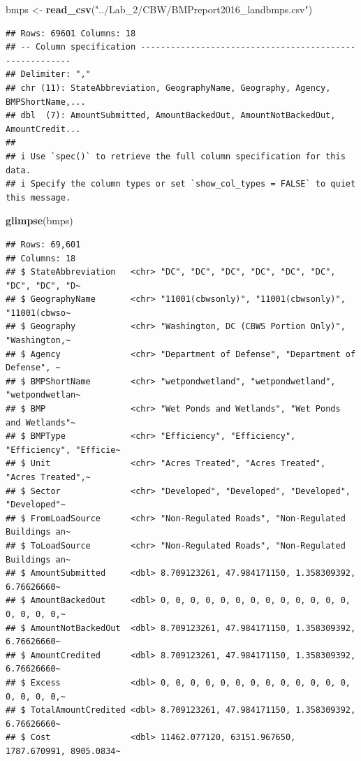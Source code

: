 \documentclass[
]{article}
\newenvironment{Shaded}{\begin{snugshade}}{\end{snugshade}}
\newcommand{\FunctionTok}[1]{\textcolor[rgb]{0.13,0.29,0.53}{\textbf{#1}}}
\newcommand{\NormalTok}[1]{#1}
\newcommand{\OtherTok}[1]{\textcolor[rgb]{0.56,0.35,0.01}{#1}}
\newcommand{\StringTok}[1]{\textcolor[rgb]{0.31,0.60,0.02}{#1}}
\begin{document}
\begin{Shaded}
\begin{Highlighting}[]
\NormalTok{bmps }\OtherTok{\textless{}{-}} \FunctionTok{read\_csv}\NormalTok{(}\StringTok{"../Lab\_2/CBW/BMPreport2016\_landbmps.csv"}\NormalTok{)}
\end{Highlighting}
\end{Shaded}

\begin{verbatim}
## Rows: 69601 Columns: 18
## -- Column specification --------------------------------------------------------
## Delimiter: ","
## chr (11): StateAbbreviation, GeographyName, Geography, Agency, BMPShortName,...
## dbl  (7): AmountSubmitted, AmountBackedOut, AmountNotBackedOut, AmountCredit...
## 
## i Use `spec()` to retrieve the full column specification for this data.
## i Specify the column types or set `show_col_types = FALSE` to quiet this message.
\end{verbatim}

\begin{Shaded}
\begin{Highlighting}[]
\FunctionTok{glimpse}\NormalTok{(bmps)}
\end{Highlighting}
\end{Shaded}

\begin{verbatim}
## Rows: 69,601
## Columns: 18
## $ StateAbbreviation   <chr> "DC", "DC", "DC", "DC", "DC", "DC", "DC", "DC", "D~
## $ GeographyName       <chr> "11001(cbwsonly)", "11001(cbwsonly)", "11001(cbwso~
## $ Geography           <chr> "Washington, DC (CBWS Portion Only)", "Washington,~
## $ Agency              <chr> "Department of Defense", "Department of Defense", ~
## $ BMPShortName        <chr> "wetpondwetland", "wetpondwetland", "wetpondwetlan~
## $ BMP                 <chr> "Wet Ponds and Wetlands", "Wet Ponds and Wetlands"~
## $ BMPType             <chr> "Efficiency", "Efficiency", "Efficiency", "Efficie~
## $ Unit                <chr> "Acres Treated", "Acres Treated", "Acres Treated",~
## $ Sector              <chr> "Developed", "Developed", "Developed", "Developed"~
## $ FromLoadSource      <chr> "Non-Regulated Roads", "Non-Regulated Buildings an~
## $ ToLoadSource        <chr> "Non-Regulated Roads", "Non-Regulated Buildings an~
## $ AmountSubmitted     <dbl> 8.709123261, 47.984171150, 1.358309392, 6.76626660~
## $ AmountBackedOut     <dbl> 0, 0, 0, 0, 0, 0, 0, 0, 0, 0, 0, 0, 0, 0, 0, 0, 0,~
## $ AmountNotBackedOut  <dbl> 8.709123261, 47.984171150, 1.358309392, 6.76626660~
## $ AmountCredited      <dbl> 8.709123261, 47.984171150, 1.358309392, 6.76626660~
## $ Excess              <dbl> 0, 0, 0, 0, 0, 0, 0, 0, 0, 0, 0, 0, 0, 0, 0, 0, 0,~
## $ TotalAmountCredited <dbl> 8.709123261, 47.984171150, 1.358309392, 6.76626660~
## $ Cost                <dbl> 11462.077120, 63151.967650, 1787.670991, 8905.0834~
\end{verbatim}
\end{document}
